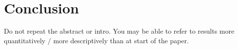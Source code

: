 \section{Conclusion}\label{sec:conclusion}
Do not repeat the abstract or intro.
You may be able to refer to results more quantitatively / more descriptively
than at start of the paper.